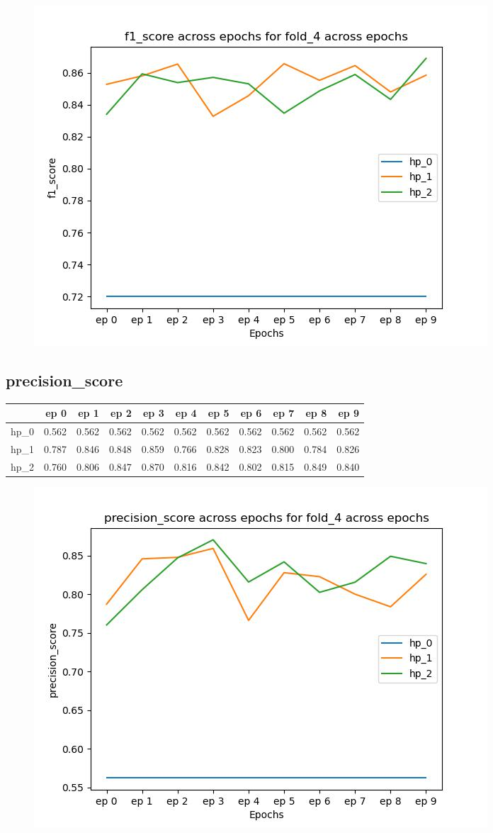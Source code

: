 \documentclass{article}
\begin{document}
\begin{figure}[H]
\includegraphics[scale = 0.75]{fold_4/f1_score}
\end{figure}
\subsection{precision\_score}
\begin{tabular}{lrrrrrrrrrr}
\toprule
{} &   ep 0 &   ep 1 &   ep 2 &   ep 3 &   ep 4 &   ep 5 &   ep 6 &   ep 7 &   ep 8 &   ep 9 \\
\midrule
hp\_0 &  0.562 &  0.562 &  0.562 &  0.562 &  0.562 &  0.562 &  0.562 &  0.562 &  0.562 &  0.562 \\
hp\_1 &  0.787 &  0.846 &  0.848 &  0.859 &  0.766 &  0.828 &  0.823 &  0.800 &  0.784 &  0.826 \\
hp\_2 &  0.760 &  0.806 &  0.847 &  0.870 &  0.816 &  0.842 &  0.802 &  0.815 &  0.849 &  0.840 \\
\bottomrule
\end{tabular}

\begin{figure}[H]
\includegraphics[scale = 0.75]{fold_4/precision_score}
\end{figure}
\end{document}
